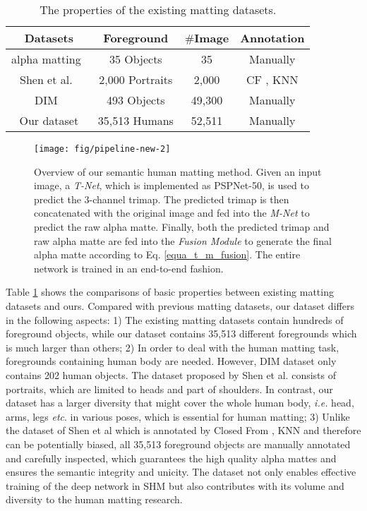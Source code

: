 \newcommand{\tabincell}[2]{\begin{tabular}{@{}#1@{}}#2\end{tabular}}
\begin{table}[t]
\caption{The properties of the existing matting datasets.}
\centering
\begin{tabular}{cccc}
  \toprule
  Datasets & Foreground  & $\#$Image & Annotation \\
  \midrule
  alpha matting~\cite{rhemann2009perceptually}    &    35 Objects       &    35   &  Manually \\  
  Shen et al.~\cite{shen2016deep} &  2,000 Portraits       &   2,000    & CF \cite{levin2008closed}, KNN \cite{chen2013knn} \\
DIM~\cite{xu2017deep}  &  493 Objects  &   49,300  & Manually  \\
  Our dataset &  35,513 Humans      & 52,511        & Manually  \\ 
  \bottomrule
\end{tabular}
\label{tab:dataset_components}
\end{table}

\begin{figure*}[hbt]
  \texttt{[image: fig/pipeline-new-2]}
  \caption{Overview of our semantic human matting method.
  	Given an input image, a \emph{T-Net}, which is implemented as PSPNet-50, is used to predict the 3-channel trimap. The predicted trimap is then concatenated with the original image and fed into the \emph{M-Net} to predict the raw alpha matte.
  	Finally, both the predicted trimap and raw alpha matte are fed into the \emph{Fusion Module} to generate the final alpha matte according to Eq. \ref{equa_t_m_fusion}.
  	The entire network is trained in an end-to-end fashion.
}
  \label{pipeline}
\end{figure*}

Table \ref{tab:dataset_components} shows the comparisons of basic properties between existing matting datasets and ours. Compared with previous matting datasets, our dataset differs in the following aspects:
1) The existing matting datasets contain hundreds of foreground objects, while our dataset contains 35,513 different foregrounds which is much larger than others;
2) In order to deal with the human matting task, foregrounds containing human body are needed.
However, DIM\cite{xu2017deep} dataset only contains 202 human objects.
The dataset proposed by Shen et al. \cite{shen2016deep} consists of portraits, which are limited to heads and part of shoulders.
In contrast, our dataset has a larger diversity that might cover the whole human body, \emph{i.e.} head, arms, legs \emph{etc}. in various poses, which is essential for human matting;
3) Unlike the dataset of Shen et al \cite{shen2016deep} which is annotated by Closed From \cite{levin2008closed}, KNN \cite{chen2013knn} and therefore can be potentially biased, all 35,513 foreground objects are manually annotated and carefully inspected, which guarantees the high quality alpha mattes and ensures the semantic integrity and unicity.
The dataset not only enables effective training of the deep network in SHM but also contributes with its volume and diversity to the human matting research.

